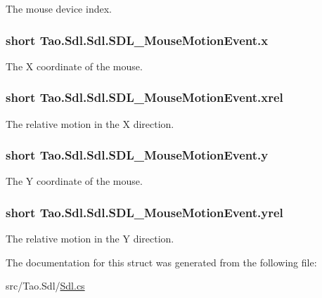 The mouse device index. 

\hypertarget{struct_tao_1_1_sdl_1_1_sdl_1_1_s_d_l___mouse_motion_event_ab187d711c2cb67bd63e14fb9031f0bf4}{
\subsubsection[{x}]{\setlength{\rightskip}{0pt plus 5cm}short {\bf Tao.Sdl.Sdl.SDL\_\-MouseMotionEvent.x}}}
\label{struct_tao_1_1_sdl_1_1_sdl_1_1_s_d_l___mouse_motion_event_ab187d711c2cb67bd63e14fb9031f0bf4}


The X coordinate of the mouse. 

\hypertarget{struct_tao_1_1_sdl_1_1_sdl_1_1_s_d_l___mouse_motion_event_ab8dbb38820da1b901feeda37d501b0c4}{
\subsubsection[{xrel}]{\setlength{\rightskip}{0pt plus 5cm}short {\bf Tao.Sdl.Sdl.SDL\_\-MouseMotionEvent.xrel}}}
\label{struct_tao_1_1_sdl_1_1_sdl_1_1_s_d_l___mouse_motion_event_ab8dbb38820da1b901feeda37d501b0c4}


The relative motion in the X direction. 

\hypertarget{struct_tao_1_1_sdl_1_1_sdl_1_1_s_d_l___mouse_motion_event_a774d079f176855431e1c9f255048ce1d}{
\subsubsection[{y}]{\setlength{\rightskip}{0pt plus 5cm}short {\bf Tao.Sdl.Sdl.SDL\_\-MouseMotionEvent.y}}}
\label{struct_tao_1_1_sdl_1_1_sdl_1_1_s_d_l___mouse_motion_event_a774d079f176855431e1c9f255048ce1d}


The Y coordinate of the mouse. 

\hypertarget{struct_tao_1_1_sdl_1_1_sdl_1_1_s_d_l___mouse_motion_event_ac5098052e2663cc8ce48dd8f309ca28f}{
\subsubsection[{yrel}]{\setlength{\rightskip}{0pt plus 5cm}short {\bf Tao.Sdl.Sdl.SDL\_\-MouseMotionEvent.yrel}}}
\label{struct_tao_1_1_sdl_1_1_sdl_1_1_s_d_l___mouse_motion_event_ac5098052e2663cc8ce48dd8f309ca28f}


The relative motion in the Y direction. 



The documentation for this struct was generated from the following file:\begin{DoxyCompactItemize}
\item 
src/Tao.Sdl/\hyperlink{_sdl_8cs}{Sdl.cs}\end{DoxyCompactItemize}
